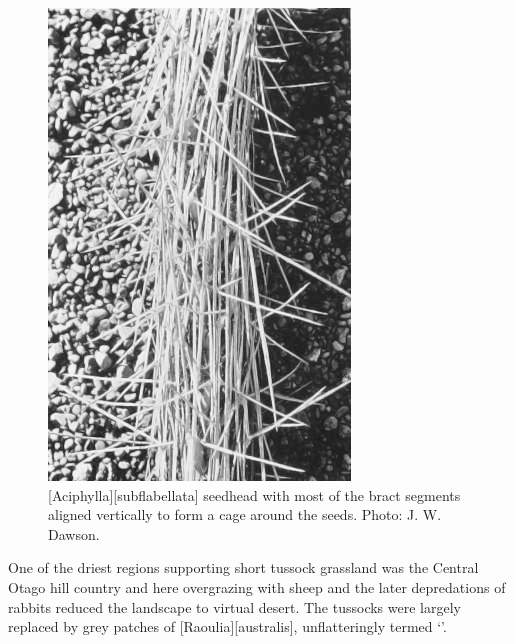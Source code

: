 \begin{figure}[t]
\begin{minipage}[t]{\textwidth}
\begin{minipage}[t]{(\textwidth-\fgap) * \real{0.477}}
			\includegraphics[width=\textwidth]{graphics/fig_085}
			\caption[\emph{Aciphylla subflabellata} seedhead]{[Aciphylla][subflabellata] seedhead with most of the bract segments aligned vertically to form a cage around the seeds.
			Photo:  J. W. Dawson.}%
			\label{fig:85aciphylla-seedhead}
		\end{minipage}
	\end{minipage}
\end{figure}

One of the driest regions supporting short tussock grassland was the Central Otago hill country and here overgrazing with sheep and the later depredations of rabbits reduced the landscape to virtual desert.
The tussocks were largely replaced by grey patches of [Raoulia][australis], unflatteringly termed `'.


